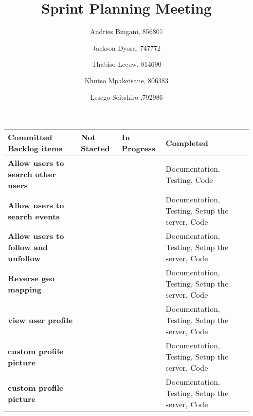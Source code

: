 \documentclass[10pt,a4paper]{article}
\title{Sprint Planning Meeting}
\author{
  Andries Bingani, 856807 \and
  Jackson Dyora, 747772\and
  Thabiso Leeuw, 814690 \and
  Khutso Mpaketsane, 806383 \and
  Lesego Seitshiro ,792986
}
\begin{document}
\maketitle



\begin{center}
\begin{tabular}{ || m{4cm} | m{4cm}| m{4cm} |m{3.5cm} || } 
\hline
\hline
\textbf{Committed Backlog items} & \textbf{Not Started} & \textbf{In Progress} & \textbf{Completed} \\ 
\hline
\hline
\textbf{ Allow users to search other users} &  &  & Documentation, Testing, Code\\ 
\hline
\textbf{Allow users to search events} &  &  & Documentation, Testing, Setup the server, Code\\ 
\hline
\textbf{Allow users to follow and unfollow} & &  & Documentation, Testing, Setup the server, Code  \\ 
\hline
\textbf{Reverse geo mapping} & &  &  Documentation, Testing, Setup the server, Code  \\ 
\hline
\textbf{view user profile} & &  &  Documentation, Testing, Setup the server, Code  \\ 
\hline
\textbf{ custom profile picture}  & &  &  Documentation, Testing, Setup the server, Code  \\ 
\hline
\textbf{ custom profile picture}  & &  &  Documentation, Testing, Setup the server, Code  \\ 
\hline
\hline
\end{tabular}
\end{center}
\end{document}
